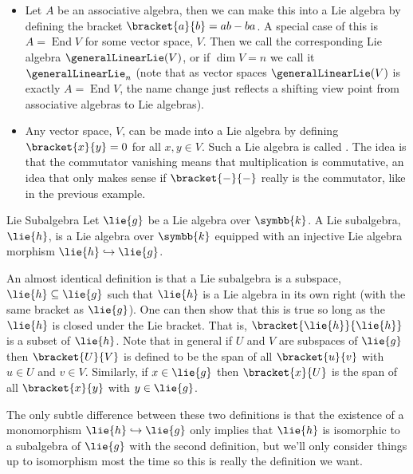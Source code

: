 \documentclass[fleqn]{NotesClass}
\renewcommand{\field}{\symbb{k}}
\DeclareMathOperator{\End}{End}
\begin{document}
    \begin{exm}{}{}
        \begin{itemize}
            \item Let \(A\) be an associative algebra, then we can make this into a Lie algebra by defining the bracket \(\bracket{a}{b} = ab - ba\).
            A special case of this is \(A = \End V\) for some vector space, \(V\).
            Then we call the corresponding Lie algebra \(\generalLinearLie(V)\), or if \(\dim V = n\) we call it \(\generalLinearLie_n\) (note that as vector spaces \(\generalLinearLie(V)\) is exactly \(A = \End V\), the name change just reflects a shifting view point from associative algebras to Lie algebras).
            \item Any vector space, \(V\), can be made into a Lie algebra by defining \(\bracket{x}{y} = 0\) for all \(x, y \in V\).
            Such a Lie algebra is called .
            The idea is that the commutator vanishing means that multiplication is commutative, an idea that only makes sense if \(\bracket{-}{-}\) really is the commutator, like in the previous example.
        \end{itemize}
    \end{exm}
    
    \begin{dfn}{Lie Subalgebra}{}
        Let \(\lie{g}\) be a Lie algebra over \(\field\).
        A Lie subalgebra, \(\lie{h}\), is a Lie algebra over \(\field\) equipped with an injective Lie algebra morphism \(\lie{h} \hookrightarrow \lie{g}\).
    \end{dfn}
    
    An almost identical definition is that a Lie subalgebra is a subspace, \(\lie{h} \subseteq \lie{g}\) such that \(\lie{h}\) is a Lie algebra in its own right (with the same bracket as \(\lie{g}\)).
    One can then show that this is true so long as the \(\lie{h}\) is closed under the Lie bracket.
    That is, \(\bracket{\lie{h}}{\lie{h}}\) is a subset of \(\lie{h}\).
    Note that in general if \(U\) and \(V\) are subspaces of \(\lie{g}\) then \(\bracket{U}{V}\) is defined to be the span of all \(\bracket{u}{v}\) with \(u \in U\) and \(v \in V\).
    Similarly, if \(x \in \lie{g}\) then \(\bracket{x}{U}\) is the span of all \(\bracket{x}{y}\) with \(y \in \lie{g}\).
    
    The only subtle difference between these two definitions is that the existence of a monomorphism \(\lie{h} \hookrightarrow \lie{g}\) only implies that \(\lie{h}\) is isomorphic to a subalgebra of \(\lie{g}\) with the second definition, but we'll only consider things up to isomorphism most the time so this is really the definition we want.
    
\end{document}
